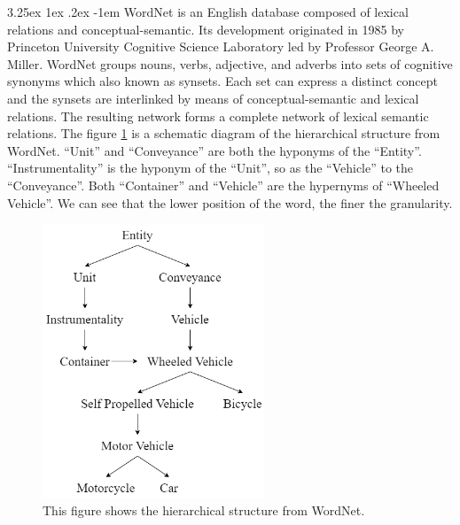 \documentclass[12pt]{article}
\makeatletter
\renewcommand\paragraph{\@startsection{paragraph}{5}{\z@}%
  {3.25ex \@plus1ex \@minus.2ex}%
  {-1em}%
  {\normalfont\normalsize\bfseries}}
\makeatother
\begin{document}
\begin{CJK*}{UTF8}{bkai}
\begin{spacing}{1.77}
\paragraph{}
WordNet \cite{wordnet} is an English database composed of lexical relations and conceptual-semantic. Its development originated in 1985 by Princeton University Cognitive Science Laboratory led by Professor George A. Miller. WordNet groups nouns, verbs, adjective, and adverbs into sets of cognitive synonyms which also known as synsets. Each set can express a distinct concept and the synsets are interlinked by means of conceptual-semantic and lexical relations. The resulting network forms a complete network of lexical semantic relations. The figure \ref{fig:wordnet} is a schematic diagram of the hierarchical structure from WordNet. ``Unit'' and ``Conveyance'' are both the hyponyms of the ``Entity''. ``Instrumentality'' is the hyponym of the ``Unit'', so as the ``Vehicle'' to the ``Conveyance''. Both ``Container'' and ``Vehicle'' are the hypernyms of ``Wheeled Vehicle''. We can see that the lower position of the word, the finer the granularity.

\begin{figure}[H]
  \centering
  \includegraphics[width=250px]{WordNet.png}
  \caption[Hierarchical Structure of WordNet]{This figure shows the hierarchical structure from WordNet.}
  \label{fig:wordnet}
\end{figure}


\end{spacing}
\end{CJK*}
\end{document}
